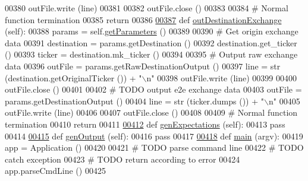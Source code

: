 \begin{DoxyCode}
{00380         outFile.write (line)
00381         
00382         outFile.close ()
00383     
00384         \textcolor{comment}{# Normal function termination }
00385         \textcolor{keywordflow}{return} 
00386     
\hypertarget{e2e_8py_source.tex_l00387}{}\hyperlink{classe2e_1_1_application_a1b099bee6f8170c4c52e7ae884d95b27}{00387}     \textcolor{keyword}{def }\hyperlink{classe2e_1_1_application_a1b099bee6f8170c4c52e7ae884d95b27}{outDestinationExchange} (self):
00388         params = self.\hyperlink{classe2e_1_1_application_ae7bc7b58f19d681635cfa8ae06d9769b}{getParameters} ()
00389         
00390         \textcolor{comment}{# Get origin exchange data}
00391         destination = params.getDestination ()
00392         destination.get\_ticker ()
00393         ticker = destination.mk\_ticker ()
00394 
00395         \textcolor{comment}{# Output raw exchange data}
00396         outFile = params.getRawDestinationOutput ()
00397         line = str (destination.getOriginalTicker ()) + \textcolor{stringliteral}{"\(\backslash\)n"}
00398         outFile.write (line)
00399         
00400         outFile.close ()
00401     
00402         \textcolor{comment}{# TODO output e2e exchange data}
00403         outFile = params.getDestinationOutput ()
00404         line = str (ticker.dumps ()) + \textcolor{stringliteral}{"\(\backslash\)n"}
00405         outFile.write (line)
00406         
00407         outFile.close ()
00408     
00409         \textcolor{comment}{# Normal function termination }
00410         \textcolor{keywordflow}{return} 
00411     
\hypertarget{e2e_8py_source.tex_l00412}{}\hyperlink{classe2e_1_1_application_a72b854da6d69dbcb5031f24dccf9cc71}{00412}     \textcolor{keyword}{def }\hyperlink{classe2e_1_1_application_a72b854da6d69dbcb5031f24dccf9cc71}{genExpectations} (self):
00413         \textcolor{keywordflow}{pass}
00414     
\hypertarget{e2e_8py_source.tex_l00415}{}\hyperlink{classe2e_1_1_application_a0f753699fabab3ae17407b36404d3b64}{00415}     \textcolor{keyword}{def }\hyperlink{classe2e_1_1_application_a0f753699fabab3ae17407b36404d3b64}{genOutput} (self):
00416         \textcolor{keywordflow}{pass}
00417 
\hypertarget{e2e_8py_source.tex_l00418}{}\hyperlink{namespacee2e_afb3e7d384688a07b72e1df5201192375}{00418} \textcolor{keyword}{def }\hyperlink{namespacee2e_afb3e7d384688a07b72e1df5201192375}{main} (argv):
00419     app = Application ()
00420     
00421     \textcolor{comment}{# TODO parse command line }
00422     \textcolor{comment}{# TODO catch exception}
00423     \textcolor{comment}{# TODO return according to error}
00424     app.parseCmdLine ()
00425     
}
\end{DoxyCode}
